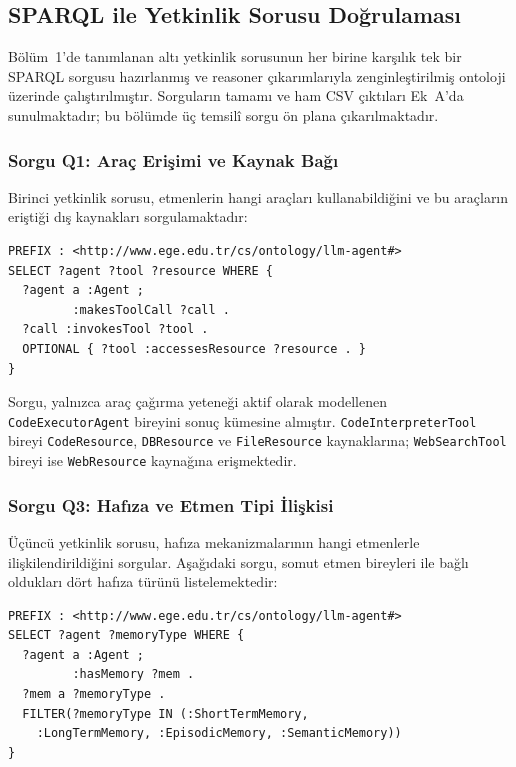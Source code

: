 \documentclass[10pt, a4paper, twocolumn]{article}
\begin{document}
\subsection{SPARQL ile Yetkinlik Sorusu Doğrulaması}

Bölüm~1'de tanımlanan altı yetkinlik sorusunun her birine karşılık tek bir SPARQL sorgusu hazırlanmış ve reasoner çıkarımlarıyla zenginleştirilmiş ontoloji üzerinde çalıştırılmıştır. Sorguların tamamı ve ham CSV çıktıları Ek~A'da sunulmaktadır; bu bölümde üç temsilî sorgu ön plana çıkarılmaktadır.

\subsubsection*{Sorgu Q1: Araç Erişimi ve Kaynak Bağı}

Birinci yetkinlik sorusu, etmenlerin hangi araçları kullanabildiğini ve bu araçların eriştiği dış kaynakları sorgulamaktadır:

\begin{lstlisting}[language=sparql]
PREFIX : <http://www.ege.edu.tr/cs/ontology/llm-agent#>
SELECT ?agent ?tool ?resource WHERE {
  ?agent a :Agent ;
         :makesToolCall ?call .
  ?call :invokesTool ?tool .
  OPTIONAL { ?tool :accessesResource ?resource . }
}
\end{lstlisting}

\noindent Sorgu, yalnızca araç çağırma yeteneği aktif olarak modellenen \texttt{CodeExecutorAgent} bireyini sonuç kümesine almıştır. \texttt{CodeInterpreterTool} bireyi \texttt{CodeResource}, \texttt{DBResource} ve \texttt{FileResource} kaynaklarına; \texttt{WebSearchTool} bireyi ise \texttt{WebResource} kaynağına erişmektedir.

\subsubsection*{Sorgu Q3: Hafıza ve Etmen Tipi İlişkisi}

Üçüncü yetkinlik sorusu, hafıza mekanizmalarının hangi etmenlerle ilişkilendirildiğini sorgular. Aşağıdaki sorgu, somut etmen bireyleri ile bağlı oldukları dört hafıza türünü listelemektedir:

\begin{lstlisting}[language=sparql]
PREFIX : <http://www.ege.edu.tr/cs/ontology/llm-agent#>
SELECT ?agent ?memoryType WHERE {
  ?agent a :Agent ;
         :hasMemory ?mem .
  ?mem a ?memoryType .
  FILTER(?memoryType IN (:ShortTermMemory,
    :LongTermMemory, :EpisodicMemory, :SemanticMemory))
}
\end{lstlisting}
\end{document}
